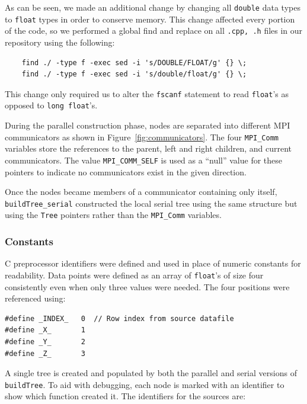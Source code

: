 \documentclass{article}
\begin{document}
As can be seen, we made an additional change by changing all \texttt{double} data types to \texttt{float} types in order to conserve memory. This change affected every portion of the code, so we performed a global find and replace on all \texttt{.cpp, .h} files in our repository using the following:

\lstset{language=C++, keepspaces=true}
\begin{lstlisting}
	find ./ -type f -exec sed -i 's/DOUBLE/FLOAT/g' {} \;
	find ./ -type f -exec sed -i 's/double/float/g' {} \;
\end{lstlisting}

This change only required us to alter the \texttt{fscanf} statement to read \texttt{float}'s as opposed to \texttt{long float}'s.

During the parallel construction phase, nodes are separated into different MPI communicators as shown in Figure~\ref{fig:communicators}. The four \texttt{MPI\_Comm} variables store the references to the parent, left and right children, and current communicators. The value \texttt{MPI\_COMM\_SELF} is used as a ``null'' value for these pointers to indicate no communicators exist in the given direction.

Once the nodes became members of a communicator containing only itself, \texttt{buildTree\_serial} constructed the local serial tree using the same structure but using the \texttt{Tree} pointers rather than the \texttt{MPI\_Comm} variables.


%
%

\subsubsection{Constants}\label{sec:constants}

C preprocessor identifiers were defined and used in place of numeric constants for readability. Data points were defined as an array of \texttt{float}'s of size four consistently even when only three values were needed. The four positions were referenced using:

\lstset{language=C++, keepspaces=true}
\begin{lstlisting}
#define _INDEX_   0  // Row index from source datafile
#define _X_       1
#define _Y_       2
#define _Z_       3
\end{lstlisting}

A single tree is created and populated by both the parallel and serial versions of \texttt{buildTree}. To aid with debugging, each node is marked with an identifier to show which function created it. The identifiers for the sources are:
\end{document}
